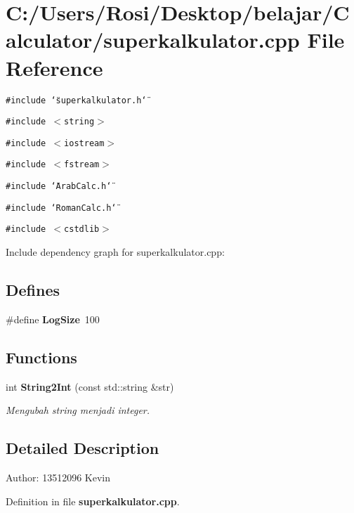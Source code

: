 \section{C:/Users/Rosi/Desktop/belajar/Calculator/superkalkulator.cpp File Reference}
\label{superkalkulator_8cpp}
{\tt \#include \char`\"{}superkalkulator.h\char`\"{}}\par
{\tt \#include $<$string$>$}\par
{\tt \#include $<$iostream$>$}\par
{\tt \#include $<$fstream$>$}\par
{\tt \#include \char`\"{}Arab\-Calc.h\char`\"{}}\par
{\tt \#include \char`\"{}Roman\-Calc.h\char`\"{}}\par
{\tt \#include $<$cstdlib$>$}\par


Include dependency graph for superkalkulator.cpp:\subsection*{Defines}
\begin{CompactItemize}
\item 
\#define {\bf Log\-Size}~100\label{superkalkulator_8cpp_1de0ce7e12fae2d31360ed36ad565092}

\end{CompactItemize}
\subsection*{Functions}
\begin{CompactItemize}
\item 
int {\bf String2Int} (const std::string \&str)\label{superkalkulator_8cpp_4e641ae577d3199df1f75dde81656047}

\begin{CompactList}\small\item\em Mengubah string menjadi integer. \item\end{CompactList}\end{CompactItemize}


\subsection{Detailed Description}
\begin{Desc}
\item[Author:]13512096 Kevin \end{Desc}


Definition in file {\bf superkalkulator.cpp}.